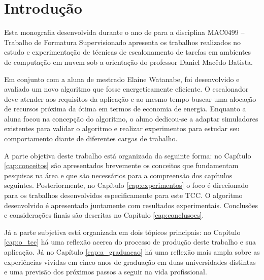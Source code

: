 \chapter{Introdução}
\label{cap:introducao}
Esta monografia desenvolvida durante o ano de  para a disciplina MAC0499 --
Trabalho de Formatura Supervisionado apresenta os trabalhos realizados no estudo
e experimentação de técnicas de escalonamento de tarefas em ambientes de 
computação em nuvem sob a orientação do professor Daniel Macêdo Batista.

Em conjunto com a aluna de mestrado Elaine Watanabe, foi desenvolvido e avaliado
um novo algoritmo que fosse energeticamente eficiente. O escalonador deve
atender aos requisitos da aplicação e ao mesmo tempo buscar uma alocação
de recursos próxima da ótima em termos de economia de energia.
Enquanto a aluna focou na concepção do algoritmo, o aluno dedicou-se a adaptar
simuladores existentes para validar o algoritmo e realizar experimentos para 
estudar seu comportamento diante de diferentes cargas de trabalho.

A parte objetiva deste trabalho está organizada da seguinte forma: no Capítulo
\ref{cap:conceitos} são apresentados brevemente os conceitos que fundamentam
pesquisas na área e que são necessários para a compreensão dos capítulos
seguintes. Posteriormente, no Capítulo \ref{cap:experimentos} o foco é
direcionado para os trabalhos desenvolvidos especificamente para este TCC. 
O algoritmo desenvolvido é apresentado juntamente com resultados experimentais.
Conclusões e considerações finais são descritas no Capítulo
\ref{cap:conclusoes}.

Já a parte subjetiva está organizada em dois tópicos principais: no Capítulo 
\ref{cap:o_tcc} há uma reflexão acerca do processo de produção deste trabalho
e sua aplicação. Já no Capítulo \ref{cap:a_graduacao} há uma reflexão mais ampla
sobre as experiências vividas em cinco anos de graduação em duas universidades
distintas e uma previsão dos próximos passos a seguir na vida profissional.


